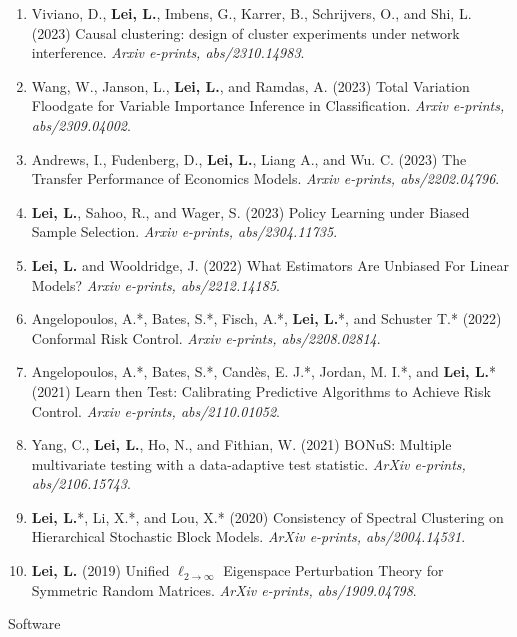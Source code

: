 \documentclass{article}
\begin{document}
\begin{enumerate}
\item Viviano, D., \textbf{Lei, L.}, Imbens, G., Karrer, B., Schrijvers, O., and Shi, L. (2023) Causal clustering: design of cluster experiments under network interference. \emph{Arxiv e-prints, abs/2310.14983}.
\item Wang, W., Janson, L., \textbf{Lei, L.}, and Ramdas, A. (2023) Total Variation Floodgate for Variable Importance Inference in Classification. \emph{Arxiv e-prints, abs/2309.04002}.
\item Andrews, I., Fudenberg, D., \textbf{Lei, L.}, Liang A., and Wu. C. (2023) The Transfer Performance of Economics Models. \emph{Arxiv e-prints, abs/2202.04796}.
\item \textbf{Lei, L.}, Sahoo, R., and Wager, S. (2023) Policy Learning under Biased Sample Selection. \emph{Arxiv e-prints, abs/2304.11735}.  
\item \textbf{Lei, L.} and Wooldridge, J. (2022) What Estimators Are Unbiased For Linear Models? \emph{Arxiv e-prints, abs/2212.14185}.
\item Angelopoulos, A.*, Bates, S.*, Fisch, A.*, \textbf{Lei, L.}*, and Schuster T.* (2022) Conformal Risk Control. \emph{Arxiv e-prints, abs/2208.02814}.
\item Angelopoulos, A.*, Bates, S.*, Cand\`{e}s, E. J.*, Jordan, M. I.*, and \textbf{Lei, L.}* (2021) Learn then Test: Calibrating Predictive Algorithms to Achieve Risk Control. \emph{Arxiv e-prints, abs/2110.01052}.
\item Yang, C., \textbf{Lei, L.}, Ho, N., and Fithian, W. (2021) BONuS: Multiple multivariate testing with a data-adaptive test statistic. \emph{ArXiv e-prints, abs/2106.15743}.
\item \textbf{Lei, L.}*, Li, X.*, and Lou, X.* (2020) Consistency of Spectral Clustering on Hierarchical Stochastic Block Models. \emph{ArXiv e-prints, abs/2004.14531}.
\item \textbf{Lei, L.} (2019) Unified $\ell_{2\rightarrow\infty}$ Eigenspace Perturbation Theory for Symmetric Random Matrices. \emph{ArXiv e-prints, abs/1909.04798}.
\end{enumerate}

\begin{large}
\noindent Software
\end{large}
\end{document}
